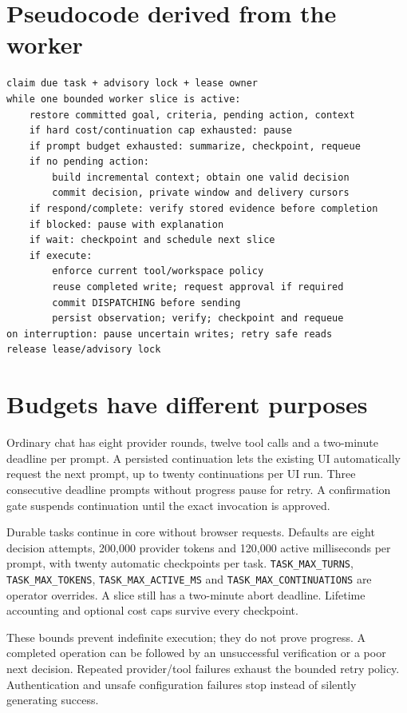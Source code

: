 \section*{Pseudocode derived from the worker}
\begin{lstlisting}
claim due task + advisory lock + lease owner
while one bounded worker slice is active:
    restore committed goal, criteria, pending action, context
    if hard cost/continuation cap exhausted: pause
    if prompt budget exhausted: summarize, checkpoint, requeue
    if no pending action:
        build incremental context; obtain one valid decision
        commit decision, private window and delivery cursors
    if respond/complete: verify stored evidence before completion
    if blocked: pause with explanation
    if wait: checkpoint and schedule next slice
    if execute:
        enforce current tool/workspace policy
        reuse completed write; request approval if required
        commit DISPATCHING before sending
        persist observation; verify; checkpoint and requeue
on interruption: pause uncertain writes; retry safe reads
release lease/advisory lock
\end{lstlisting}
\section*{Budgets have different purposes}
Ordinary chat has eight provider rounds, twelve tool calls and a two-minute deadline per prompt. A persisted continuation lets the existing UI automatically request the next prompt, up to twenty continuations per UI run. Three consecutive deadline prompts without progress pause for retry. A confirmation gate suspends continuation until the exact invocation is approved.

Durable tasks continue in core without browser requests. Defaults are eight decision attempts, 200,000 provider tokens and 120,000 active milliseconds per prompt, with twenty automatic checkpoints per task. \texttt{TASK\_MAX\_TURNS}, \texttt{TASK\_MAX\_TOKENS}, \texttt{TASK\_MAX\_ACTIVE\_MS} and \texttt{TASK\_MAX\_CONTINUATIONS} are operator overrides. A slice still has a two-minute abort deadline. Lifetime accounting and optional cost caps survive every checkpoint.

These bounds prevent indefinite execution; they do not prove progress. A completed operation can be followed by an unsuccessful verification or a poor next decision. Repeated provider/tool failures exhaust the bounded retry policy. Authentication and unsafe configuration failures stop instead of silently generating success.
